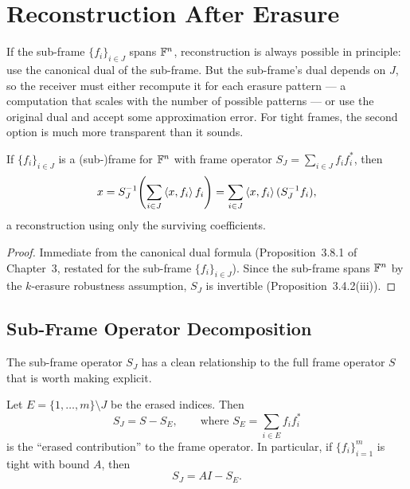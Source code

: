 \section{Reconstruction After Erasure}
\label{sec:reconstruction-after-erasure}

If the sub-frame $\{f_i\}_{i\in J}$ spans $\mathbb{F}^n$, reconstruction is
always possible in principle: use the canonical dual of the sub-frame.
But the sub-frame's dual depends on $J$, so the receiver must either
recompute it for each erasure pattern --- a computation that scales with
the number of possible patterns --- or use the original dual and accept
some approximation error. For tight frames, the second option is much
more transparent than it sounds.

\begin{proposition}
\label{prop:exact-recon-after-erasure}
If $\{f_i\}_{i\in J}$ is a (sub-)frame for $\mathbb{F}^n$ with frame operator
$S_J = \sum_{i\in J} f_if_i^*$, then
\[
  x = S_J^{-1}\!\left(\sum_{i\in J}\left\langle x, f_i \right\rangle f_i\right)
  = \sum_{i\in J}\left\langle x, f_i \right\rangle(S_J^{-1}f_i),
\]
a reconstruction using only the surviving coefficients.
\end{proposition}

\begin{proof}
Immediate from the canonical dual formula (Proposition~3.8.1 of
Chapter~3, restated for the sub-frame $\{f_i\}_{i\in J}$). Since the
sub-frame spans $\mathbb{F}^n$ by the $k$-erasure robustness assumption, $S_J$
is invertible (Proposition~3.4.2(iii)).
\end{proof}

\subsection{Sub-Frame Operator Decomposition}
\label{subsec:subframe-decomposition}

The sub-frame operator $S_J$ has a clean relationship to the full frame
operator $S$ that is worth making explicit.

\begin{proposition}
\label{prop:subframe-operator}
Let $E=\{1,\ldots,m\}\setminus J$ be the erased indices. Then
\[
  S_J = S - S_E, \qquad\text{where } S_E = \sum_{i\in E}f_if_i^*
\]
is the ``erased contribution'' to the frame operator. In particular, if
$\{f_i\}_{i=1}^m$ is tight with bound $A$, then
\begin{equation}
\label{eq:subframe-tight}
  S_J = AI - S_E.
\end{equation}
\end{proposition}

